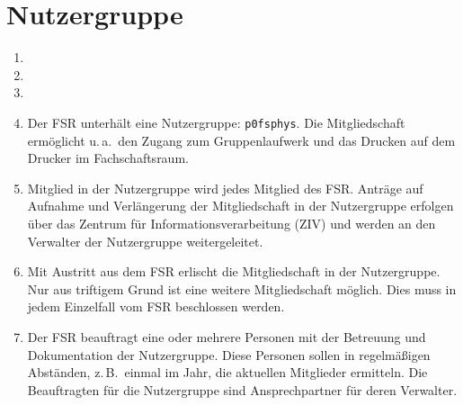 \section{Nutzergruppe}
\begin{enumerate}
	\item {}
	\item {}
	\item {}
	\item Der FSR unterhält eine Nutzergruppe: \texttt{p0fsphys}.
	Die Mitgliedschaft ermöglicht u.\,a.\ den Zugang zum Gruppenlaufwerk und das Drucken auf dem Drucker im Fachschaftsraum.
	\item Mitglied in der Nutzergruppe wird jedes Mitglied des FSR.
	Anträge auf Aufnahme und Verlängerung der Mitgliedschaft in der Nutzergruppe erfolgen über das Zentrum für Informationsverarbeitung (ZIV) und werden an den Verwalter der Nutzergruppe weitergeleitet.
	\item Mit Austritt aus dem FSR erlischt die Mitgliedschaft in der Nutzergruppe.
	Nur aus triftigem Grund ist eine weitere Mitgliedschaft möglich.
	Dies muss in jedem Einzelfall vom FSR beschlossen werden.
	\item Der FSR beauftragt eine oder mehrere Personen mit der Betreuung und Dokumentation der Nutzergruppe.
	Diese Personen sollen in regelmäßigen Abständen, z.\,B.\ einmal im Jahr, die aktuellen Mitglieder ermitteln.
	Die Beauftragten für die Nutzergruppe sind Ansprechpartner für deren Verwalter.
\end{enumerate}

